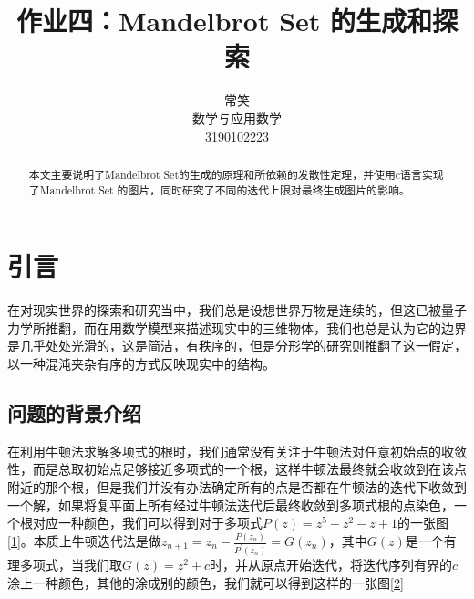 \documentclass{ctexart}
\title{作业四：Mandelbrot Set 的生成和探索}
\author{常笑 \\ 数学与应用数学 \\ 3190102223 }
\begin{document}
\maketitle

\begin{abstract}
本文主要说明了Mandelbrot Set的生成的原理和所依赖的发散性定理，并使用c语言实现了Mandelbrot Set 的图片，同时研究了不同的迭代上限对最终生成图片的影响。
\\
\end{abstract}
\thispagestyle{empty}

\section{引言}
\indent 在对现实世界的探索和研究当中，我们总是设想世界万物是连续的，但这已被量子力学所推翻，而在用数学模型来描述现实中的三维物体，我们也总是认为它的边界是几乎处处光滑的，这是简洁，有秩序的，但是分形学的研究则推翻了这一假定，以一种混沌夹杂有序的方式反映现实中的结构。
\subsection{问题的背景介绍}
\indent 在利用牛顿法求解多项式的根时，我们通常没有关注于牛顿法对任意初始点的收敛性，而是总取初始点足够接近多项式的一个根，这样牛顿法最终就会收敛到在该点附近的那个根，但是我们并没有办法确定所有的点是否都在牛顿法的迭代下收敛到一个解，如果将复平面上所有经过牛顿法迭代后最终收敛到多项式根的点染色，一个根对应一种颜色，我们可以得到对于多项式$P(z) = z^5 + z^2 - z + 1$的一张图\ref{1}\cite{3B1B_Mandelbrot_Set}。本质上牛顿迭代法是做$z_{n+1} = z_n - \frac{P(z_n)}{P^{'}(z_n)} = G(z_n)$，其中$G(z)$是一个有理多项式，当我们取$G(z) = z^2 + c$时，并从原点开始迭代，将迭代序列有界的$c$涂上一种颜色，其他的涂成别的颜色，我们就可以得到这样的一张图\ref{2}\\

\begin{figure}[h]
\centering
{}
\caption{}
\end{figure}
\end{document}
